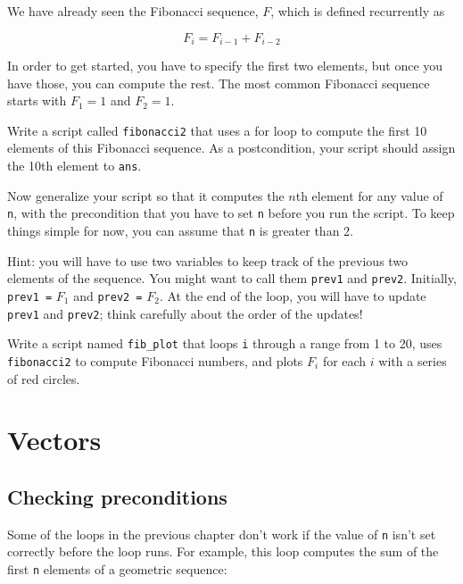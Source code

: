 \documentclass{book}
\begin{document}
\begin{ex}
\label{fib2}

We have already seen the Fibonacci sequence, $F$, which
is defined recurrently as

\[ F_{i} = F_{i-1} + F_{i-2} \]

In order to get started, you have to specify the first two
elements, but once you have those, you can compute the rest.
The most common Fibonacci sequence starts with $F_1 = 1$ and $F_2 = 1$.

Write a script called {\tt fibonacci2} that uses a for loop
to compute the first 10 elements of this Fibonacci sequence.
As a postcondition, your script should assign the 10th element to
{\tt ans}.

Now generalize your script so that it computes the $n$th element
for any value of {\tt n}, with the precondition that you have to
set {\tt n} before you run the script. To keep things simple for
now, you can assume that {\tt n} is greater than 2.

Hint: you will have to use two variables to keep track of the
previous two elements of the sequence. You might want to call
them {\tt prev1} and {\tt prev2}. Initially, {\tt prev1 =} $F_1$
and {\tt prev2 =} $F_2$. At the end of the loop, you will have
to update {\tt prev1} and {\tt prev2}; think carefully about the
order of the updates!
\end{ex}


\begin{ex}
\label{fib_plot}

Write a script named {\tt fib\_plot} that loops {\tt i}
through a range from 1 to 20, uses {\tt fibonacci2} to compute
Fibonacci numbers, and plots $F_i$ for each $i$ with a series of red
circles.

\end{ex}


\chapter{Vectors}
\label{vectors}

\section{Checking preconditions}

Some of the loops in the previous chapter don't work
if the value of {\tt n} isn't set correctly before the loop runs.
For example, this loop computes the sum of the first {\tt n} elements
of a geometric sequence:
\end{document}
